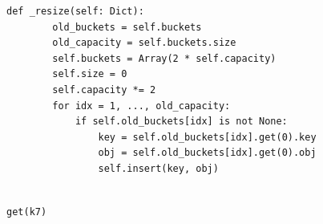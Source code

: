 \documentclass[mathserif, handout]{beamer}
\begin{document}
\begin{frame}[fragile]
	\begin{proofbox}
		\begin{lstlisting}[style=mypython]
def _resize(self: Dict):
        old_buckets = self.buckets
        old_capacity = self.buckets.size
        self.buckets = Array(2 * self.capacity)
        self.size = 0
        self.capacity *= 2
        for idx = 1, ..., old_capacity:
            if self.old_buckets[idx] is not None:
                key = self.old_buckets[idx].get(0).key
                obj = self.old_buckets[idx].get(0).obj
                self.insert(key, obj)
\end{lstlisting}
	\end{proofbox}
\end{frame}

\begin{frame}
	\begin{center}
		 \\[1mm]
		\footnotesize\color{gray} \texttt{get(k7)}
	\end{center}

	\begin{figure}
\end{figure}
\end{frame}
\end{document}
